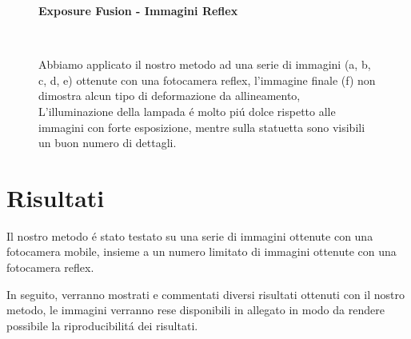 \documentclass[10pt,journal,cspaper,compsoc]{IEEEtran}
\newcommand*{\figuretitle}[1]{%
    {\centering%
    \textbf{#1}%
    \par\medskip}%
}
\begin{document}
\begin{figure}[ht]
    \centering
    \figuretitle{Exposure Fusion - Immagini Reflex} 
     \hfill
     \hfill
    \\[0pt]
     \hfill
     \hfill
     \hfill

    \caption[Commento Reflex.]{
        Abbiamo applicato il nostro metodo ad una serie di immagini (a, b, c, d, e) ottenute con una fotocamera reflex,
        l'immagine finale (f) non dimostra alcun tipo di deformazione da allineamento, L'illuminazione della lampada 
        é molto piú dolce rispetto alle immagini con forte esposizione, mentre sulla statuetta sono visibili un buon 
        numero di dettagli.
    }\label{fig:fusion}

\end{figure}


\section{Risultati}

Il nostro metodo é stato testato su una serie di immagini ottenute con una fotocamera mobile, insieme 
a un numero limitato di immagini ottenute con una fotocamera reflex. 

In seguito, verranno mostrati e commentati diversi risultati ottenuti con il nostro metodo, le immagini 
verranno rese disponibili in allegato in modo da rendere possibile la riproducibilitá dei risultati.




\end{document}
